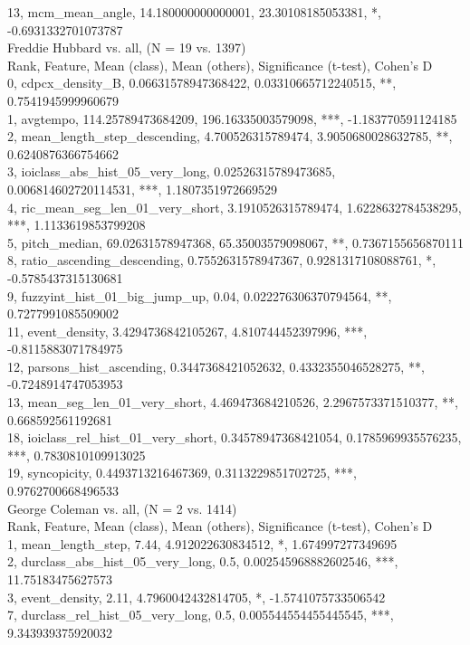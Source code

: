 13, mcm_mean_angle, 14.180000000000001, 23.30108185053381, *, -0.6931332701073787\\
Freddie Hubbard vs. all, (N = 19 vs. 1397)\\
Rank, Feature, Mean (class), Mean (others), Significance (t-test), Cohen's D\\
0, cdpcx_density_B, 0.06631578947368422, 0.03310665712240515, **, 0.7541945999960679\\
1, avgtempo, 114.25789473684209, 196.16335003579098, ***, -1.183770591124185\\
2, mean_length_step_descending, 4.700526315789474, 3.9050680028632785, **, 0.6240876366754662\\
3, ioiclass_abs_hist_05_very_long, 0.02526315789473685, 0.006814602720114531, ***, 1.1807351972669529\\
4, ric_mean_seg_len_01_very_short, 3.1910526315789474, 1.6228632784538295, ***, 1.1133619853799208\\
5, pitch_median, 69.02631578947368, 65.35003579098067, **, 0.7367155656870111\\
8, ratio_ascending_descending, 0.7552631578947367, 0.9281317108088761, *, -0.5785437315130681\\
9, fuzzyint_hist_01_big_jump_up, 0.04, 0.022276306370794564, **, 0.7277991085509002\\
11, event_density, 3.4294736842105267, 4.810744452397996, ***, -0.8115883071784975\\
12, parsons_hist_ascending, 0.3447368421052632, 0.4332355046528275, **, -0.7248914747053953\\
13, mean_seg_len_01_very_short, 4.469473684210526, 2.2967573371510377, **, 0.668592561192681\\
18, ioiclass_rel_hist_01_very_short, 0.34578947368421054, 0.1785969935576235, ***, 0.7830810109913025\\
19, syncopicity, 0.4493713216467369, 0.3113229851702725, ***, 0.9762700668496533\\
George Coleman vs. all, (N = 2 vs. 1414)\\
Rank, Feature, Mean (class), Mean (others), Significance (t-test), Cohen's D\\
1, mean_length_step, 7.44, 4.912022630834512, *, 1.674997277349695\\
2, durclass_abs_hist_05_very_long, 0.5, 0.002545968882602546, ***, 11.75183475627573\\
3, event_density, 2.11, 4.7960042432814705, *, -1.5741075733506542\\
7, durclass_rel_hist_05_very_long, 0.5, 0.005544554455445545, ***, 9.343939375920032\\
